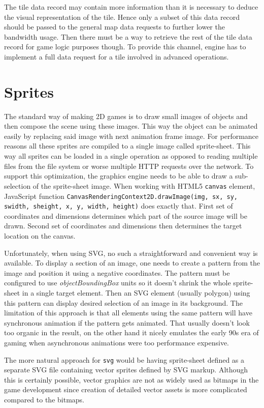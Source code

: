 \documentclass[11pt,oneside, final]{fithesis2}
\begin{document}
The tile data record may contain more information than it is necessary to deduce the visual representation of the tile. Hence only a subset of this data record should be passed to the general map data requests to further lower the bandwidth usage. Then there must be a way to retrieve the rest of the tile data record for game logic purposes though. To provide this channel, engine has to implement a full data request for a tile involved in advanced operations.

\section{Sprites}
The standard way of making 2D games is to draw small images of objects and then compose the scene using these images. This way the object can be animated easily by replacing said image with next animation frame image. For performance reasons all these sprites are compiled to a single image called sprite-sheet. This way all sprites can be loaded in a single operation as opposed to reading multiple files from the file system or worse multiple HTTP requests over the network.\cite{pagella} To support this optimization, the graphics engine needs to be able to draw a sub-selection of the sprite-sheet image. When working with HTML5 \texttt{canvas} element, JavaScript function \texttt{CanvasRenderingContext2D.drawImage(img, sx, sy, swidth, sheight, x, y, width, height)} does exactly that\cite{canvasdrawimage}. First set of coordinates and dimensions determines which part of the source image will be drawn. Second set of coordinates and dimensions then determines the target location on the canvas.

Unfortunately, when using SVG, no such a straightforward and convenient way is available. To display a section of an image, one needs to create a pattern from the image and position it using a negative coordinates. The pattern must be configured to use \emph{objectBoundingBox} units so it doesn't shrink the whole sprite-sheet in a single target element. Then an SVG element (usually polygon) using this pattern can display desired selection of an image in its background. The limitation of this approach is that all elements using the same pattern will have synchronous animation if the pattern gets animated. That usually doesn't look too organic in the result, on the other hand it nicely emulates the early 90s era of gaming when asynchronous animations were too performance expensive.

The more natural approach for \texttt{svg} would be having sprite-sheet defined as a separate SVG file containing vector sprites defined by SVG markup. Although this is certainly possible, vector graphics are not as widely used as bitmaps in the game development since creation of detailed vector assets is more complicated compared to the bitmaps.
\end{document}
